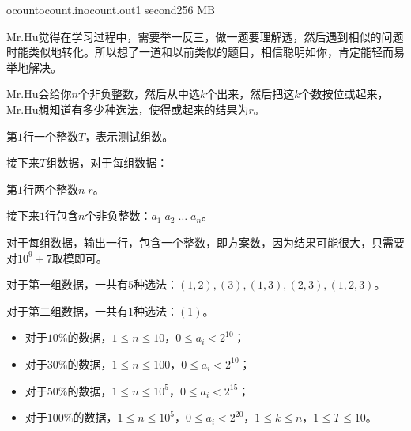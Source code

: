 \documentclass[11pt,a4paper,oneside]{article}
\begin{document}
\begin{problem}{ocount}{ocount.in}{ocount.out}{1 second}{256 MB}	
	
	Mr.Hu觉得在学习过程中，需要举一反三，做一题要理解透，然后遇到相似的问题时能类似地转化。所以想了一道和以前类似的题目，相信聪明如你，肯定能轻而易举地解决。
	
	Mr.Hu会给你$n$个非负整数，然后从中选$k$个出来，然后把这$k$个数按位或起来，Mr.Hu想知道有多少种选法，使得或起来的结果为$r$。
	
	\InputFile
	
	第$1$行一个整数$T$，表示测试组数。
	
	接下来$T$组数据，对于每组数据：
	
	第$1$行两个整数$n \; r$。
	
	接下来$1$行包含$n$个非负整数：$a_1 \; a_2 \; \dots \; a_n$。
	
	\OutputFile
	
	对于每组数据，输出一行，包含一个整数，即方案数，因为结果可能很大，只需要对$10^9 + 7$取模即可。
	
	\Example
	
	\begin{example}
	\end{example}
	
	对于第一组数据，一共有$5$种选法：$(1,2),(3),(1,3),(2,3),(1,2,3)$。
	
	对于第二组数据，一共有$1$种选法：$(1)$。
	
	\Note
	
	\begin{itemize}
		\item 对于$10\%$的数据，$1 \leq n \leq 10$，$0 \leq a_i < 2^{10}$；
		\item 对于$30\%$的数据，$1 \leq n \leq 100$，$0 \leq a_i < 2^{10}$；
		\item 对于$50\%$的数据，$1 \leq n \leq 10^5$，$0 \leq a_i < 2^{15}$；
		\item 对于$100\%$的数据，$1 \leq n \leq 10^5$，$0 \leq a_i < 2^{20}$，$1 \leq k \leq n$，$1 \leq T \leq 10$。
	\end{itemize}
	
\end{problem}
\end{document}
